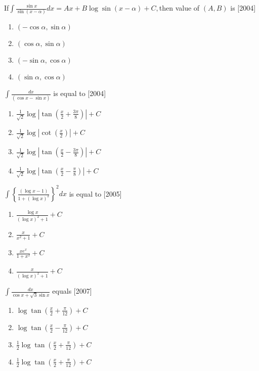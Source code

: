 \iffalse
\title{Assignment}
\author{K.AKSHAY TEJA}
\section{mains}
\fi
\item If$\int$$\frac{\sin x}{\sin (x-\alpha)}dx = Ax+B\log \sin (x-\alpha)+C,$then value of $(A,B)$ is    \hfill        [2004]
\begin{enumerate}
       \item { $(-\cos \alpha, \sin \alpha)$ }  
       \item  $(\cos \alpha,\sin \alpha)$
       \item    $(-\sin \alpha,\cos \alpha)$   
       \item  $(\sin \alpha,\cos \alpha)$ 
\end{enumerate}

\item   $\int\frac{dx}{(\cos x-\sin x)}$ is equal to             \hfill [2004]
      \begin{enumerate}
\item  $\frac{1}{\sqrt{2}}\log \left|\tan \left(\frac{x}{2}+\frac{3\pi}{8}\right)\right|+C$

\item  $\frac{1}{\sqrt{2}}\log \left|\cot \left(\frac{x}{2}\right)\right|+C$ 

\item  {$\frac{1}{\sqrt{2}}\log \left|\tan \left(\frac{x}{2}-\frac{3\pi}{8}\right)\right|+C$}

\item  {$\frac{1}{\sqrt{2}}\log \left|\tan \left(\frac{x}{2}-\frac{\pi}{8}\right)\right|+C$}
\end{enumerate}
\item  $\int\left\{ \frac{(\log x-1)}{1+(\log x)^2}\right\}^2 dx$ is equal to     \hfill [2005]
 \begin{enumerate} 
\item  $\frac{\log x}{(\log x)^2 +1}+C$         
\item  $\frac{x}{x^2+1}+C$
\item  $\frac{xe^x}{1+x^2}+C$                       
\item  $\frac{x}{(\log x)^2+1}+C$
\end{enumerate}
\item $\int \frac{dx}{\cos x + \sqrt{3} \sin x}$ equals \hfill [2007]
  \begin{enumerate}
\item  $\log \tan \left(\frac{x}{2}+\frac{\pi}{12}\right)+C$
\item  $\log \tan \left(\frac{x}{2}-\frac{\pi}{12}\right)+C$
\item  $\frac{1}{2} \log \tan \left(\frac{x}{2}+\frac{\pi}{12}\right)+C$
\item  $\frac{1}{2} \log \tan \left(\frac{x}{2}+\frac{\pi}{12}\right)+C$
\end{enumerate}



